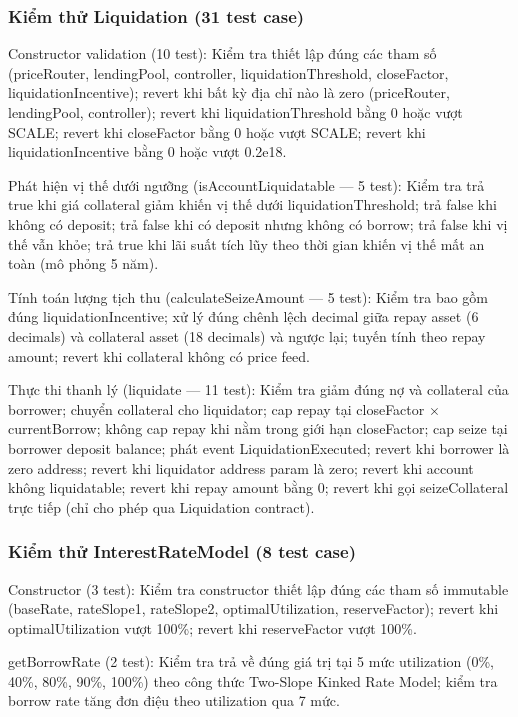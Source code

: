 \documentclass[../DoAn.tex]{subfiles}
\begin{document}
\subsubsection{Kiểm thử Liquidation (31 test case)}


Constructor validation (10 test): Kiểm tra thiết lập đúng các tham số (priceRouter, lendingPool, controller, liquidationThreshold, closeFactor, liquidationIncentive); revert khi bất kỳ địa chỉ nào là zero (priceRouter, lendingPool, controller); revert khi liquidationThreshold bằng 0 hoặc vượt SCALE; revert khi closeFactor bằng 0 hoặc vượt SCALE; revert khi liquidationIncentive bằng 0 hoặc vượt 0.2e18.

Phát hiện vị thế dưới ngưỡng (isAccountLiquidatable --- 5 test): Kiểm tra trả true khi giá collateral giảm khiến vị thế dưới liquidationThreshold; trả false khi không có deposit; trả false khi có deposit nhưng không có borrow; trả false khi vị thế vẫn khỏe; trả true khi lãi suất tích lũy theo thời gian khiến vị thế mất an toàn (mô phỏng 5 năm).

Tính toán lượng tịch thu (calculateSeizeAmount --- 5 test): Kiểm tra bao gồm đúng liquidationIncentive; xử lý đúng chênh lệch decimal giữa repay asset (6 decimals) và collateral asset (18 decimals) và ngược lại; tuyến tính theo repay amount; revert khi collateral không có price feed.

Thực thi thanh lý (liquidate --- 11 test): Kiểm tra giảm đúng nợ và collateral của borrower; chuyển collateral cho liquidator; cap repay tại closeFactor $\times$ currentBorrow; không cap repay khi nằm trong giới hạn closeFactor; cap seize tại borrower deposit balance; phát event LiquidationExecuted; revert khi borrower là zero address; revert khi liquidator address param là zero; revert khi account không liquidatable; revert khi repay amount bằng 0; revert khi gọi seizeCollateral trực tiếp (chỉ cho phép qua Liquidation contract).

\subsubsection{Kiểm thử InterestRateModel (8 test case)}


Constructor (3 test): Kiểm tra constructor thiết lập đúng các tham số immutable (baseRate, rateSlope1, rateSlope2, optimalUtilization, reserveFactor); revert khi optimalUtilization vượt 100\%; revert khi reserveFactor vượt 100\%.

getBorrowRate (2 test): Kiểm tra trả về đúng giá trị tại 5 mức utilization (0\%, 40\%, 80\%, 90\%, 100\%) theo công thức Two-Slope Kinked Rate Model; kiểm tra borrow rate tăng đơn điệu theo utilization qua 7 mức.
\end{document}
